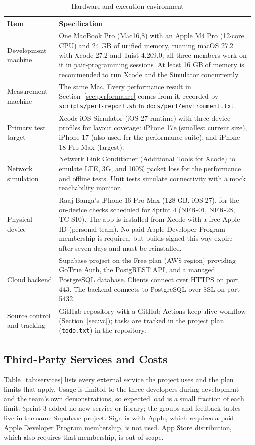 \documentclass[12pt,letterpaper]{article}
\begin{document}
\begin{table}[H]
\centering
\caption{Hardware and execution environment}
\label{tab:hardware}
\begin{tabularx}{\textwidth}{@{}L{3.3cm} Y@{}}
\toprule
\textbf{Item} & \textbf{Specification} \\
\midrule
Development machine & One MacBook Pro (Mac16,8) with an Apple M4 Pro (12-core CPU) and 24 GB of unified memory, running macOS 27.2 with Xcode 27.2 and Tuist 4.209.0; all three members work on it in pair-programming sessions. At least 16 GB of memory is recommended to run Xcode and the Simulator concurrently. \\
Measurement machine & The same Mac. Every performance result in Section~\ref{sec:performance} comes from it, recorded by \texttt{scripts/perf-report.sh} in \texttt{docs/perf/environment.txt}. \\
Primary test target & Xcode iOS Simulator (iOS 27 runtime) with three device profiles for layout coverage: iPhone 17e (smallest current size), iPhone 17 (also used for the performance suite), and iPhone 18 Pro Max (largest). \\
Network simulation & Network Link Conditioner (Additional Tools for Xcode) to emulate LTE, 3G, and 100\% packet loss for the performance and offline tests. Unit tests simulate connectivity with a mock reachability monitor. \\
Physical device & Raaj Banga's iPhone 16 Pro Max (128 GB, iOS 27), for the on-device checks scheduled for Sprint 4 (NFR-01, NFR-28, TC-S10). The app is installed from Xcode with a free Apple ID (personal team). No paid Apple Developer Program membership is required, but builds signed this way expire after seven days and must be reinstalled. \\
Cloud backend & Supabase project on the Free plan (AWS region) providing GoTrue Auth, the PostgREST API, and a managed PostgreSQL database. Clients connect over HTTPS on port 443. The backend connects to PostgreSQL over SSL on port 5432. \\
Source control and tracking & GitHub repository with a GitHub Actions keep-alive workflow (Section~\ref{sec:vc}); tasks are tracked in the project plan (\texttt{todo.txt}) in the repository. \\
\bottomrule
\end{tabularx}
\end{table}

\subsection{Third-Party Services and Costs}
Table~\ref{tab:services} lists every external service the project uses and the plan
limits that apply. Usage is limited to the three developers during development and
the team's own demonstrations, so expected load is a small fraction of each limit.
Sprint 3 added no new service or library; the groups and feedback tables live in the
same Supabase project.
Sign in with Apple, which requires a paid Apple Developer Program membership, is not
used. App Store distribution, which also requires that membership, is out of scope.
\end{document}
